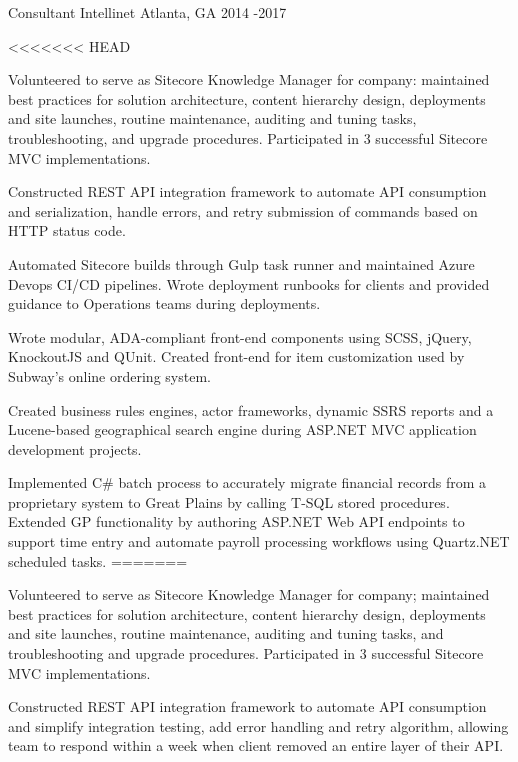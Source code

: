 \begin{cventries}
  \cventry
    {Consultant} %
    {Intellinet} %
    {Atlanta, GA} %
    {2014 -2017 } %
    {
      \begin{cvitems} %
<<<<<<< HEAD
        \item {Volunteered to serve as Sitecore Knowledge Manager for company: maintained best practices for solution architecture, content hierarchy design, deployments and site launches, routine maintenance, auditing and tuning tasks, troubleshooting, and upgrade procedures. Participated in 3 successful Sitecore MVC implementations.}
		\item {Constructed REST API integration framework to automate API consumption and serialization, handle errors, and retry submission of commands based on HTTP status code.}
		\item {Automated Sitecore builds through Gulp task runner and maintained Azure Devops CI/CD pipelines. Wrote deployment runbooks for clients and provided guidance to Operations teams during deployments.}
		\item {Wrote modular, ADA-compliant front-end components using SCSS, jQuery, KnockoutJS and QUnit. Created front-end for item customization used by Subway’s online ordering system.}
		\item {Created business rules engines, actor frameworks, dynamic SSRS reports and a Lucene-based geographical search engine during ASP.NET MVC application development projects.}
		\item {Implemented C# batch process to accurately migrate financial records from a proprietary system to Great Plains by calling T-SQL stored procedures. Extended GP functionality by authoring ASP.NET Web API endpoints to support time entry and automate payroll processing workflows using Quartz.NET scheduled tasks.}
=======
        \item {Volunteered to serve as Sitecore Knowledge Manager for company; maintained best practices for solution architecture, content hierarchy design, deployments and site launches, routine maintenance, auditing and tuning tasks, and troubleshooting and upgrade procedures. Participated in 3 successful Sitecore MVC implementations.}
		\item {Constructed REST API integration framework to automate API consumption and simplify integration testing, add error handling and retry algorithm, allowing team to respond within a week when client removed an entire layer of their API.}

\end{cvitems}}
\end{cventries}
